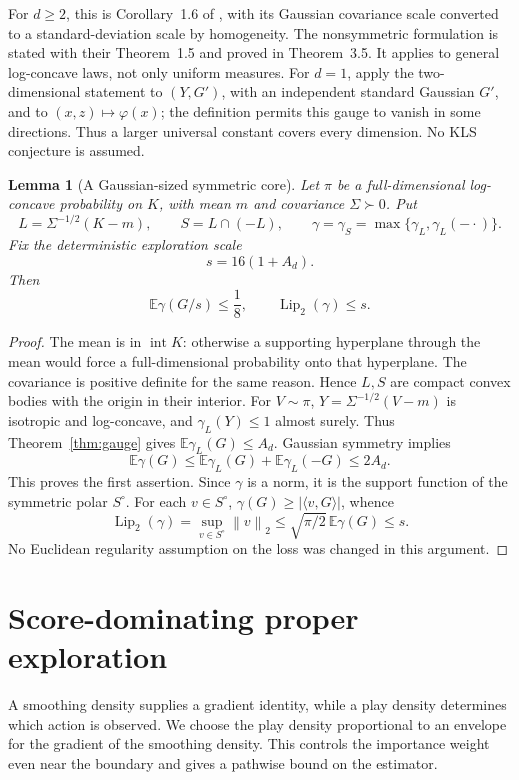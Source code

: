 \documentclass[11pt]{article}
\numberwithin{equation}{section}
\newcommand{\E}{\mathbb E}
\newcommand{\ip}[2]{\langle #1,#2\rangle}
\newcommand{\norm}[1]{\left\|#1\right\|}
\newtheorem{lemma}[theorem]{Lemma}
\theoremstyle{definition}
\theoremstyle{remark}
\begin{document}
For $d\geq2$, this is Corollary~1.6 of \citet{BK26}, with its Gaussian
covariance scale converted to a standard-deviation scale by homogeneity.
The nonsymmetric formulation is stated with their Theorem~1.5 and proved in
Theorem~3.5. It applies to general log-concave laws, not only uniform measures.
For $d=1$, apply the two-dimensional statement to $(Y,G')$, with an independent
standard Gaussian $G'$, and to $(x,z)\mapsto\varphi(x)$; the definition permits
this gauge to vanish in some directions. Thus a larger universal constant
covers every dimension. No KLS conjecture is assumed.
\begin{lemma}[A Gaussian-sized symmetric core]\label{lem:coregeometry}
Let $\pi$ be a full-dimensional log-concave probability on $K$, with mean $m$
and covariance $\Sigma\succ0$. Put
\[
 L=\Sigma^{-1/2}(K-m),\qquad
 S=L\cap(-L),\qquad \gamma=\gamma_S=\max\{\gamma_L,\gamma_L(-\cdot)\}.
\]
Fix the deterministic exploration scale
\begin{equation}\label{eq:s}
 s=16(1+A_d).
\end{equation}
Then
\begin{equation}\label{eq:coregeom}
 \E\gamma(G/s)\leq\frac18,
 \qquad \operatorname{Lip}_2(\gamma)\leq s.
\end{equation}
\end{lemma}
\begin{proof}
The mean is in $\operatorname{int}K$: otherwise a supporting hyperplane
through the mean would force a full-dimensional probability onto that
hyperplane. The covariance is positive definite for the same reason. Hence
$L,S$ are compact convex bodies with the origin in their interior.
For $V\sim\pi$, $Y=\Sigma^{-1/2}(V-m)$ is isotropic and log-concave, and
$\gamma_L(Y)\leq1$ almost surely. Thus Theorem~\ref{thm:gauge} gives
$\E\gamma_L(G)\leq A_d$. Gaussian symmetry implies
\[
 \E\gamma(G)
 \leq\E\gamma_L(G)+\E\gamma_L(-G)\leq2A_d.
\]
This proves the first assertion. Since $\gamma$ is a norm, it is the support
function of the symmetric polar $S^\circ$. For each $v\in S^\circ$,
$\gamma(G)\geq|\ip vG|$, whence
\[
 \operatorname{Lip}_2(\gamma)
 =\sup_{v\in S^\circ}\norm v_2
 \leq\sqrt{\pi/2}\,\E\gamma(G)\leq s.
\]
No Euclidean regularity assumption on the loss was changed in this argument.
\end{proof}

\section{Score-dominating proper exploration}\label{sec:sampler}
A smoothing density supplies a gradient identity, while a play density
determines which action is observed. We choose the play density proportional
to an envelope for the gradient of the smoothing density.
This controls the importance weight even near the boundary and gives a
pathwise bound on the estimator.
\end{document}
